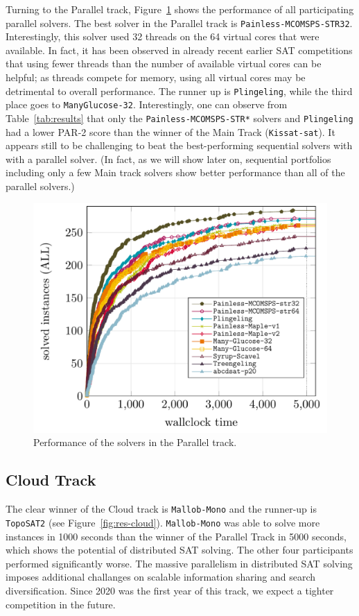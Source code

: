 \documentclass{elsarticle}
\newcommand{\solver}[1]{\texttt{#1}}
\begin{document}
Turning to the Parallel track, Figure~\ref{fig:res-parallel} shows the performance of
all participating parallel solvers. 
The best solver in the Parallel track is \solver{Painless-MCOMSPS-STR32}. Interestingly,
this solver used 32 threads on the 64 virtual cores that were available. In fact, it has been observed in already 
recent earlier 
SAT competitions that using fewer threads than the number of available virtual cores can be helpful; as threads compete 
for memory, using all virtual cores may be detrimental to  overall performance. The runner up is \solver{Plingeling}, while the
third place goes to \solver{ManyGlucose-32}. 
Interestingly, one can observe from Table~\ref{tab:results} that only the \solver{Painless-MCOMSPS-STR*} solvers
and \solver{Plingeling} had a lower PAR-2 score than the winner of the Main Track (\solver{Kissat-sat}). 
It appears still to be challenging to beat the best-performing sequential solvers with
with a parallel solver. (In fact, as we will show later on, sequential portfolios including only a few
Main track solvers show  better performance than all of the parallel solvers.)

\begin{figure}[ht]
\centering
\includegraphics[width=.9\textwidth]{img/parallel-ALL.pdf}
\caption{Performance of the solvers in the Parallel track.}
\label{fig:res-parallel}
\end{figure}

\subsection{Cloud Track}

The clear winner of the Cloud track is \solver{Mallob-Mono} and the runner-up is \solver{TopoSAT2}
(see Figure~\ref{fig:res-cloud}).
\solver{Mallob-Mono} was able to solve more instances in 1000 seconds than the 
winner of the Parallel Track in 5000 seconds, which shows the potential of distributed SAT solving. 
The other four participants performed significantly worse. 
The massive parallelism in distributed SAT solving imposes additional challanges on scalable information sharing and search diversification. 
Since 2020 was the first year of this track, we expect a tighter competition in the future. 
\end{document}
